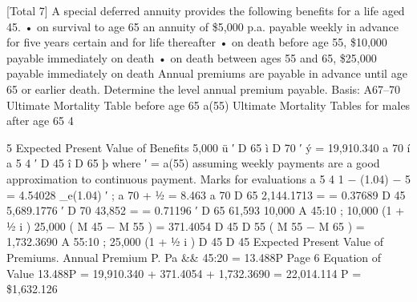 \documentclass[a4paper,1pt]{article}
\begin{document}
[Total 7]
A special deferred annuity provides the following benefits for a life aged 45.
• on survival to age 65 an annuity of \$5,000 p.a. payable weekly in advance for five years certain and for life thereafter
• on death before age 55, \$10,000 payable immediately on death
• on death between ages 55 and 65, \$25,000 payable immediately on death
Annual premiums are payable in advance until age 65 or earlier death.
Determine the level annual premium payable.
Basis: A67–70 Ultimate Mortality Table before age 65
a(55) Ultimate Mortality Tables for males after age 65
4%

5
Expected Present Value of Benefits
5,000
ü
′
D 65 ì
D 70
′ ý = 19,910.340
a 70
í a 5 4%
′
D 45 î
D 65
þ
where ′ = a(55)
assuming weekly payments are a good approximation to continuous payment.
Marks for evaluations
a 5 4%
1 − (1.04) − 5
= 4.54028
\log_{e}(1.04)
′ ; a 70 + 1⁄2 = 8.463
a 70
D 65 2,144.1713
=
= 0.37689
D 45 5,689.1776
′
D 70
43,852
=
= 0.71196
′
D 65
61,593
10,000 A 45:10 ; 10,000 (1 + 1⁄2 i )
25,000
( M 45 − M 55 )
= 371.4054
D 45
D 55
( M 55 − M 65 )
= 1,732.3690
A 55:10 ; 25,000 (1 + 1⁄2 i )
D 45
D 45
Expected Present Value of Premiums. Annual Premium P.
Pa && 45:20 = 13.488P
Page 6 %
Equation of Value
13.488P = 19,910.340 + 371.4054 + 1,732.3690 = 22,014.114
P = \$1,632.126
\end{document}
